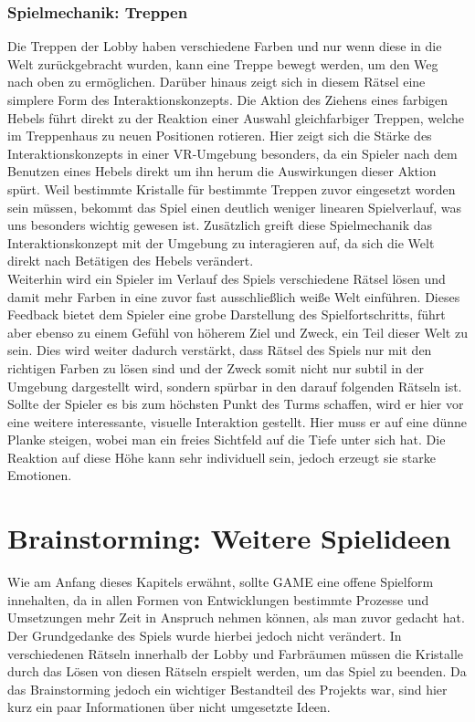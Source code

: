 \subsubsection{Spielmechanik: Treppen}
Die Treppen der Lobby haben verschiedene Farben und nur wenn diese in die Welt zurückgebracht wurden, kann eine Treppe bewegt werden, um den Weg nach oben zu ermöglichen. Darüber hinaus zeigt sich in diesem Rätsel eine simplere Form des Interaktionskonzepts. Die Aktion des Ziehens eines farbigen Hebels führt direkt zu der Reaktion einer Auswahl gleichfarbiger Treppen, welche im Treppenhaus zu neuen Positionen rotieren. Hier zeigt sich die Stärke des Interaktionskonzepts in einer VR-Umgebung besonders, da ein Spieler nach dem Benutzen eines Hebels direkt um ihn herum die Auswirkungen dieser Aktion spürt. Weil bestimmte Kristalle für bestimmte Treppen zuvor eingesetzt worden sein müssen, bekommt das Spiel einen deutlich weniger linearen Spielverlauf, was uns besonders wichtig gewesen ist. Zusätzlich greift diese Spielmechanik das Interaktionskonzept mit der Umgebung zu interagieren auf, da sich die Welt direkt nach Betätigen des Hebels verändert.\\
Weiterhin wird ein Spieler im Verlauf des Spiels verschiedene Rätsel lösen und damit mehr Farben in eine zuvor fast ausschließlich weiße Welt einführen. Dieses Feedback bietet dem Spieler eine grobe Darstellung des Spielfortschritts, führt aber ebenso zu einem Gefühl von höherem Ziel und Zweck, ein Teil dieser Welt zu sein. Dies wird weiter dadurch verstärkt, dass Rätsel des Spiels nur mit den richtigen Farben zu lösen sind und der Zweck somit nicht nur subtil in der Umgebung dargestellt wird, sondern spürbar in den darauf folgenden Rätseln ist.\\
Sollte der Spieler es bis zum höchsten Punkt des Turms schaffen, wird er hier vor eine weitere interessante, visuelle Interaktion gestellt. Hier muss er auf eine dünne Planke steigen, wobei man ein freies Sichtfeld auf die Tiefe unter sich hat. Die Reaktion auf diese Höhe kann sehr individuell sein, jedoch erzeugt sie starke Emotionen.\\

\section{Brainstorming: Weitere Spielideen}
Wie am Anfang dieses Kapitels erwähnt, sollte GAME eine offene Spielform innehalten, da in allen Formen von Entwicklungen bestimmte Prozesse und Umsetzungen mehr Zeit in Anspruch nehmen können, als man zuvor gedacht hat. Der Grundgedanke des Spiels wurde hierbei jedoch nicht verändert. In verschiedenen Rätseln innerhalb der Lobby und Farbräumen müssen die Kristalle durch das Lösen von diesen Rätseln erspielt werden, um das Spiel zu beenden. Da das Brainstorming jedoch ein wichtiger Bestandteil des Projekts war, sind hier kurz ein paar Informationen über nicht umgesetzte Ideen.
